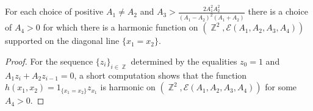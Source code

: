 \documentclass[10pt,a4paper]{amsart}
\newcommand{\ie}{i.e.\ }
\DeclareMathOperator{\Z}{\mathbb{Z}}
\begin{document}
\begin{theorem}\label{theorem:counterexample}
	For each choice of positive $A_1 \neq A_2$
	and $A_3 > \frac{2 A_1^2 A_2^2}{{(A_1-A_2)}^2 (A_1+A_2)}$
	there is a choice of $A_4 > 0$ for which there is a harmonic
	function on $(\Z^2, \mathcal{E}(A_1,A_2,A_3,A_4))$ supported on the diagonal line $\{x_1 = x_2\}$.
\end{theorem}

\begin{proof}
	For the sequence $\{z_i\}_{i \in \Z}$ determined by the equalities $z_0 = 1$ and $A_1 z_{i}  + A_2 z_{i-1} = 0$,
	a short computation shows that
	the function $h(x_1, x_2) = 1_{\{ x_1 = x_2\}} z_{x_1}$
	is harmonic on $(\Z^2, \mathcal{E}(A_1,A_2,A_3,A_4))$ for some $A_4 > 0$.
\end{proof}
\end{document}
